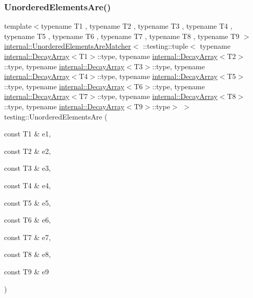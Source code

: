 \subsubsection{\texorpdfstring{Unordered\+Elements\+Are()}{UnorderedElementsAre()}\hspace{0.1cm}{\footnotesize\ttfamily [10/11]}}
{\footnotesize\ttfamily template$<$typename T1 , typename T2 , typename T3 , typename T4 , typename T5 , typename T6 , typename T7 , typename T8 , typename T9 $>$ \\
\hyperlink{classtesting_1_1internal_1_1_unordered_elements_are_matcher}{internal\+::\+Unordered\+Elements\+Are\+Matcher}$<$ \+::testing\+::tuple$<$ typename \hyperlink{structtesting_1_1internal_1_1_decay_array}{internal\+::\+Decay\+Array}$<$T1$>$\+::type, typename \hyperlink{structtesting_1_1internal_1_1_decay_array}{internal\+::\+Decay\+Array}$<$T2$>$\+::type, typename \hyperlink{structtesting_1_1internal_1_1_decay_array}{internal\+::\+Decay\+Array}$<$T3$>$\+::type, typename \hyperlink{structtesting_1_1internal_1_1_decay_array}{internal\+::\+Decay\+Array}$<$T4$>$\+::type, typename \hyperlink{structtesting_1_1internal_1_1_decay_array}{internal\+::\+Decay\+Array}$<$T5$>$\+::type, typename \hyperlink{structtesting_1_1internal_1_1_decay_array}{internal\+::\+Decay\+Array}$<$T6$>$\+::type, typename \hyperlink{structtesting_1_1internal_1_1_decay_array}{internal\+::\+Decay\+Array}$<$T7$>$\+::type, typename \hyperlink{structtesting_1_1internal_1_1_decay_array}{internal\+::\+Decay\+Array}$<$T8$>$\+::type, typename \hyperlink{structtesting_1_1internal_1_1_decay_array}{internal\+::\+Decay\+Array}$<$T9$>$\+::type$>$ $>$ testing\+::\+Unordered\+Elements\+Are (\begin{DoxyParamCaption}\item[{const T1 \&}]{e1,  }\item[{const T2 \&}]{e2,  }\item[{const T3 \&}]{e3,  }\item[{const T4 \&}]{e4,  }\item[{const T5 \&}]{e5,  }\item[{const T6 \&}]{e6,  }\item[{const T7 \&}]{e7,  }\item[{const T8 \&}]{e8,  }\item[{const T9 \&}]{e9 }\end{DoxyParamCaption})\hspace{0.3cm}{\ttfamily [inline]}}

\mbox{\label{namespacetesting_ae0e6c9754b17623a64358da8d38c4d13}} 
